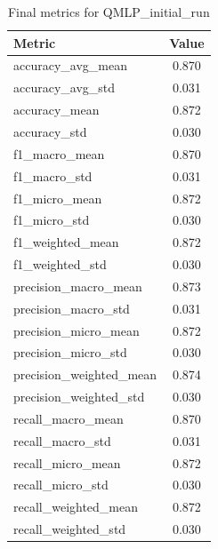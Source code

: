 \documentclass[runningheads]{llncs}
\begin{document}
\begin{table}[t]
\centering
\caption{Final metrics for QMLP\_initial\_run}\label{tab2}
\begin{tabular}{|l|c|}
\hline
Metric & Value \\
\hline
accuracy\_avg\_mean & 0.870 \\
accuracy\_avg\_std & 0.031 \\
accuracy\_mean & 0.872 \\
accuracy\_std & 0.030 \\
f1\_macro\_mean & 0.870 \\
f1\_macro\_std & 0.031 \\
f1\_micro\_mean & 0.872 \\
f1\_micro\_std & 0.030 \\
f1\_weighted\_mean & 0.872 \\
f1\_weighted\_std & 0.030 \\
precision\_macro\_mean & 0.873 \\
precision\_macro\_std & 0.031 \\
precision\_micro\_mean & 0.872 \\
precision\_micro\_std & 0.030 \\
precision\_weighted\_mean & 0.874 \\
precision\_weighted\_std & 0.030 \\
recall\_macro\_mean & 0.870 \\
recall\_macro\_std & 0.031 \\
recall\_micro\_mean & 0.872 \\
recall\_micro\_std & 0.030 \\
recall\_weighted\_mean & 0.872 \\
recall\_weighted\_std & 0.030 \\
\hline
\end{tabular}
\end{table}
\end{document}
